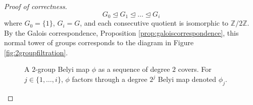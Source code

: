 \documentclass{dcthesis}
\newcommand{\PP}{\mathbb P}
\newcommand{\ZZ}{\mathbb Z}
\theoremstyle{definition}
\theoremstyle{remark}
\numberwithin{equation}{section}
\numberwithin{figure}{section}
\begin{document}
{{\begin{proof}[Proof of correctness]
      \begin{equation}\label{eqn:2groupfiltration}
        G_0\trianglelefteq G_1\trianglelefteq\dots
        \trianglelefteq G_i
      \end{equation}
      where $G_0 = \{1\}$, $G_i = G$,
      and each consecutive quotient is isomorphic
      to $\ZZ/2\ZZ$.
      By the Galois correspondence,
      Proposition \ref{prop:galoiscorrespondence},
      this normal tower of groups corresponds to
      the diagram in Figure \ref{fig:2groupfiltration}.
      \begin{figure}[ht]
        \begin{center}
        \end{center}
        \caption{
          A $2$-group Belyi map $\phi$
          as a sequence of degree $2$ covers.
          For $j\in\{1,\dots,i\}$,
          $\phi$ factors through
          a degree $2^j$ Belyi map denoted $\phi_j$.
}
\end{figure}
\end{proof}}}
\end{document}
